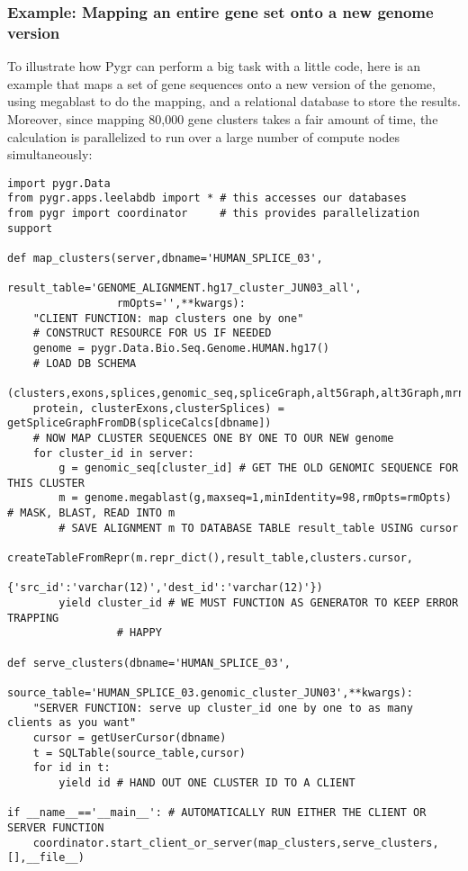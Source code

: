 \documentclass{howto}
\begin{document}
\subsubsection{Example: Mapping an entire gene set onto a new genome version}
To illustrate how Pygr can perform a big task with a little code, here is an example that maps a set of gene sequences onto a new version of the genome, using megablast to do the mapping, and a relational database to store the results.  Moreover, since mapping 80,000 gene clusters takes a fair amount of time, the calculation is parallelized to run over a large number of compute nodes simultaneously:

\begin{verbatim}
import pygr.Data
from pygr.apps.leelabdb import * # this accesses our databases
from pygr import coordinator     # this provides parallelization support

def map_clusters(server,dbname='HUMAN_SPLICE_03',
                 result_table='GENOME_ALIGNMENT.hg17_cluster_JUN03_all',
                 rmOpts='',**kwargs):
    "CLIENT FUNCTION: map clusters one by one"
    # CONSTRUCT RESOURCE FOR US IF NEEDED
    genome = pygr.Data.Bio.Seq.Genome.HUMAN.hg17()
    # LOAD DB SCHEMA
    (clusters,exons,splices,genomic_seq,spliceGraph,alt5Graph,alt3Graph,mrna, 
    protein, clusterExons,clusterSplices) = getSpliceGraphFromDB(spliceCalcs[dbname])
    # NOW MAP CLUSTER SEQUENCES ONE BY ONE TO OUR NEW genome
    for cluster_id in server:
        g = genomic_seq[cluster_id] # GET THE OLD GENOMIC SEQUENCE FOR THIS CLUSTER
        m = genome.megablast(g,maxseq=1,minIdentity=98,rmOpts=rmOpts) # MASK, BLAST, READ INTO m
        # SAVE ALIGNMENT m TO DATABASE TABLE result_table USING cursor
        createTableFromRepr(m.repr_dict(),result_table,clusters.cursor,
                            {'src_id':'varchar(12)','dest_id':'varchar(12)'})
        yield cluster_id # WE MUST FUNCTION AS GENERATOR TO KEEP ERROR TRAPPING 
		         # HAPPY

def serve_clusters(dbname='HUMAN_SPLICE_03',
                   source_table='HUMAN_SPLICE_03.genomic_cluster_JUN03',**kwargs):
    "SERVER FUNCTION: serve up cluster_id one by one to as many clients as you want"
    cursor = getUserCursor(dbname)
    t = SQLTable(source_table,cursor)
    for id in t:
        yield id # HAND OUT ONE CLUSTER ID TO A CLIENT

if __name__=='__main__': # AUTOMATICALLY RUN EITHER THE CLIENT OR SERVER FUNCTION
    coordinator.start_client_or_server(map_clusters,serve_clusters,[],__file__)
\end{verbatim}
\end{document}
